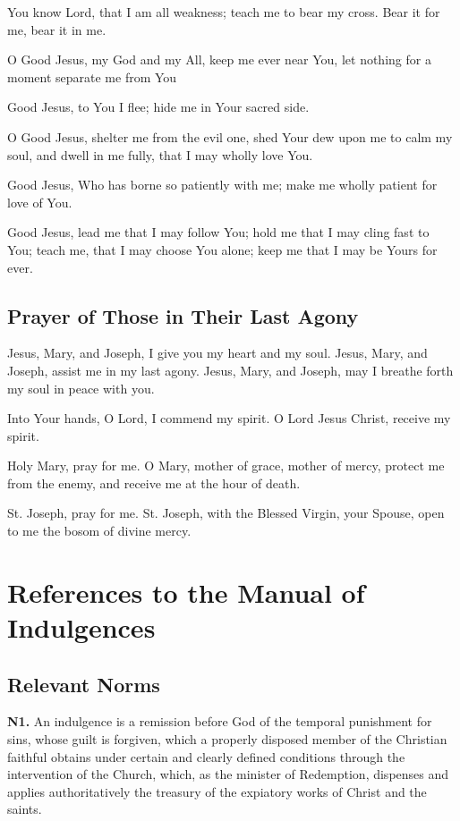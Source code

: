\documentclass[12pt]{article}
\newcommand{\prayertitle}[1]{\subsection{#1}}
\begin{document}
You know Lord, that I am all weakness; teach me to bear my cross.
Bear it for me, bear it in me.

O Good Jesus, my God and my All, keep me ever near You, let nothing for a moment separate me from You

Good Jesus, to You I flee;
hide me in Your sacred side.

O Good Jesus, shelter me from the evil one, shed Your dew upon me to calm my soul, and dwell in me fully, that I may wholly love You.

Good Jesus, Who has borne so patiently with me;
make me wholly patient for love of You.

Good Jesus, lead me that I may follow You; hold me that I may cling fast to You;
teach me, that I may choose You alone; keep me that I may be Yours for ever.

\prayertitle{Prayer of Those in Their Last Agony}
Jesus, Mary, and Joseph, I give you my heart and my soul.
Jesus, Mary, and Joseph, assist me in my last agony.
Jesus, Mary, and Joseph, may I breathe forth my soul in peace with you.

Into Your hands, O Lord, I commend my spirit.
O Lord Jesus Christ, receive my spirit.

Holy Mary, pray for me.
O Mary, mother of grace, mother of mercy, protect me from the enemy, and receive me at the hour of death.

St. Joseph, pray for me.
St. Joseph, with the Blessed Virgin, your Spouse, open to me the bosom of divine mercy.


\newpage
\appendix
\section{References to the Manual of Indulgences}
\subsection{Relevant Norms}
\newcommand{\norm}[1]{\textbf{N#1.}\newline}
\newcommand{\subnorm}[1]{§#1.}
\norm{1}
An indulgence is a remission before God of the temporal punishment for sins, whose guilt is forgiven, which a properly disposed member of the Christian faithful obtains under certain and clearly defined conditions through the intervention of the Church, which, as the minister of Redemption, dispenses and applies authoritatively the treasury of the expiatory works of Christ and the saints.
\end{document}
